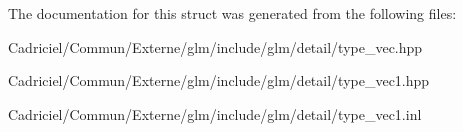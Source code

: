 The documentation for this struct was generated from the following files\+:\begin{DoxyCompactItemize}
\item 
Cadriciel/\+Commun/\+Externe/glm/include/glm/detail/type\+\_\+vec.\+hpp\item 
Cadriciel/\+Commun/\+Externe/glm/include/glm/detail/type\+\_\+vec1.\+hpp\item 
Cadriciel/\+Commun/\+Externe/glm/include/glm/detail/type\+\_\+vec1.\+inl\end{DoxyCompactItemize}
